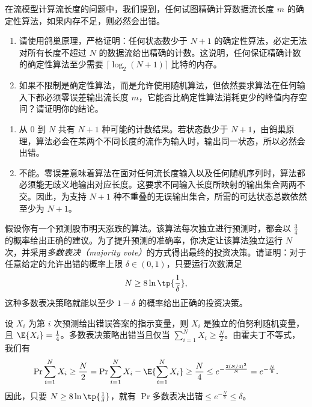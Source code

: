 \begin{exercise}
在流模型计算流长度的问题中，我们提到，任何试图精确计算数据流长度 $m$ 的确定性算法，如果内存不足，则必然会出错。
\begin{enumerate}
    \item 请使用鸽巢原理，严格证明：任何状态数少于 $N+1$ 的确定性算法，必定无法对所有长度不超过 $N$ 的数据流给出精确的计数。这说明，任何保证精确计数的确定性算法至少需要 $\lceil \log_2(N+1) \rceil$ 比特的内存。
    \item 如果不限制是确定性算法，而是允许使用随机算法，但依然要求算法在任何输入下都必须零误差输出流长度 $m$，它能否比确定性算法消耗更少的峰值内存空间？请证明你的结论。
\end{enumerate}
\end{exercise}
\begin{solution}
    \begin{enumerate}
        \item 从 $0$ 到 $N$ 共有 $N+1$ 种可能的计数结果。若状态数少于 $N+1$，由鸽巢原理，算法必会在某两个不同长度的流作为输入时，输出同一状态，所以必然会出错。
        \item 不能。零误差意味着算法在面对任何流长度输入以及任何随机序列时，算法都必须能无歧义地输出对应长度。这要求不同输入长度所映射的输出集合两两不交。因此，为支持 $N+1$ 种不重叠的无误输出集合，所需的可达状态总数依然至少为 $N+1$。
    \end{enumerate}
\end{solution}



\begin{exercise}
假设你有一个预测股市明天涨跌的算法。该算法每次独立进行预测时，都会以 $\frac{3}{4}$ 的概率给出正确的建议。为了提升预测的准确率，你决定让该算法独立运行 $N$ 次，并采用\emph{多数表决（majority vote）}的方式得出最终的投资决策。请证明：对于任意给定的允许出错的概率上限 $\delta \in (0, 1)$，只要运行次数满足
\[
    N \ge 8 \ln\tp{\frac{1}{\delta}},
\]
这种多数表决策略就能以至少 $1 - \delta$ 的概率给出正确的投资决策。
\end{exercise}
\begin{solution}
    设 $X_i$ 为第 $i$ 次预测给出错误答案的指示变量，则 $X_i$ 是独立的伯努利随机变量，且 $\E{X_i} = \frac{1}{4}$。多数表决策略出错当且仅当 $\sum_{i=1}^N X_i \ge \frac{N}{2}$。由霍夫丁不等式，我们有
    \[
        \Pr{\sum_{i=1}^N X_i \ge \frac{N}{2}} = \Pr{\sum_{i=1}^N X_i - \E{\sum_{i=1}^N X_i} \ge \frac{N}{4}} \le e^{-\frac{2(N/4)^2}{N}} = e^{-\frac{N}{8}}.
    \]
    因此，只要 $N \ge 8\ln\tp{\frac{1}{\delta}}$，就有 $\Pr{\texttt{多数表决出错}} \le e^{-\frac{N}{8}} \le \delta$。
\end{solution}

